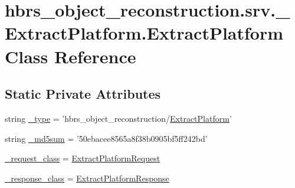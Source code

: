 \hypertarget{classhbrs__object__reconstruction_1_1srv_1_1___extract_platform_1_1_extract_platform}{\section{hbrs\-\_\-object\-\_\-reconstruction.\-srv.\-\_\-\-Extract\-Platform.\-Extract\-Platform \-Class \-Reference}
\label{classhbrs__object__reconstruction_1_1srv_1_1___extract_platform_1_1_extract_platform}
}
\subsection*{\-Static \-Private \-Attributes}
\begin{DoxyCompactItemize}
\item 
string \hyperlink{classhbrs__object__reconstruction_1_1srv_1_1___extract_platform_1_1_extract_platform_a70d61c509576f61bc181889c5f5cfe84}{\-\_\-type} = 'hbrs\-\_\-object\-\_\-reconstruction/\hyperlink{classhbrs__object__reconstruction_1_1srv_1_1___extract_platform_1_1_extract_platform}{\-Extract\-Platform}'
\item 
string \hyperlink{classhbrs__object__reconstruction_1_1srv_1_1___extract_platform_1_1_extract_platform_a12e3404e6ce6a6ce82aa1baa41a26c64}{\-\_\-md5sum} = '50ebacee8565a8f38b0905bf5ff242bd'
\item 
\hyperlink{classhbrs__object__reconstruction_1_1srv_1_1___extract_platform_1_1_extract_platform_a78f8593ed2f272bd7edd276ccba7a537}{\-\_\-request\-\_\-class} = \hyperlink{classhbrs__object__reconstruction_1_1srv_1_1___extract_platform_1_1_extract_platform_request}{\-Extract\-Platform\-Request}
\item 
\hyperlink{classhbrs__object__reconstruction_1_1srv_1_1___extract_platform_1_1_extract_platform_a83be400b7d92c535bd744f84074a9b94}{\-\_\-response\-\_\-class} = \hyperlink{classhbrs__object__reconstruction_1_1srv_1_1___extract_platform_1_1_extract_platform_response}{\-Extract\-Platform\-Response}
\end{DoxyCompactItemize}


